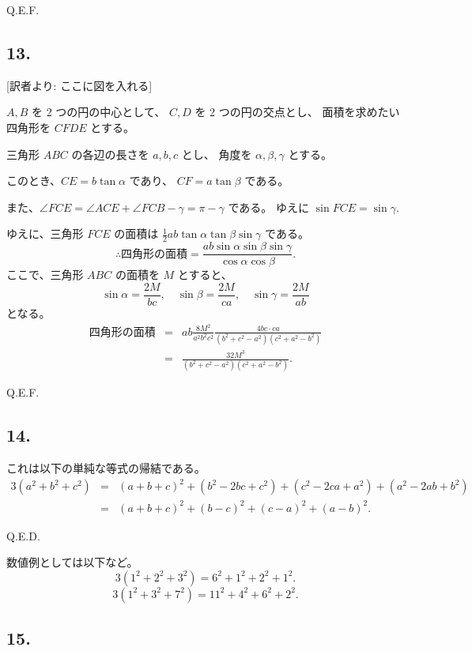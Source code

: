 Q.E.F.


\subsection*{13.}

[訳者より: ここに図を入れる]

$A, B$ を 2 つの円の中心として、
$C, D$ を 2 つの円の交点とし、
面積を求めたい四角形を $CFDE$ とする。

三角形 $ABC$ の各辺の長さを $a, b, c$ とし、
角度を $\alpha, \beta, \gamma$ とする。

このとき、$CE = b \tan \alpha$ であり、
$CF = a \tan \beta$ である。

また、$\angle FCE = \angle ACE + \angle FCB - \gamma = \pi - \gamma$
である。
ゆえに $\sin FCE = \sin \gamma$.

ゆえに、三角形 $FCE$ の面積は
$\frac{1}{2} ab \tan \alpha \tan \beta \sin \gamma$
である。
\[
\therefore
\mbox{四角形の面積} =
\frac{ab \sin \alpha \sin \beta \sin \gamma}{\cos \alpha \cos \beta}.
\]
ここで、三角形 $ABC$ の面積を $M$ とすると、
\[
\sin \alpha = \frac{2M}{bc},
\quad \sin \beta = \frac{2M}{ca},
\quad \sin \gamma = \frac{2M}{ab}
\]
となる。
\begin{eqnarray*}
\mbox{四角形の面積}
&=& ab \frac{8M^2}{a^2 b^2 c^2} \frac{4bc \cdot ca}{(b^2 + c^2 - a^2)(c^2 + a^2 - b^2)}\\
&=& \frac{32 M^3}{(b^2 + c^2 - a^2)(c^2 + a^2 - b^2)}.
\end{eqnarray*}

Q.E.F.

\subsection*{14.}

これは以下の単純な等式の帰結である。
\begin{eqnarray*}
3(a^2 + b^2 + c^2)
&=&
(a + b + c)^2 + (b^2 - 2bc + c^2) + (c^2 - 2ca + a^2) + (a^2 - 2ab + b^2)\\
&=&
(a + b + c)^2 + (b - c)^2 + (c - a)^2 + (a - b)^2.
\end{eqnarray*}

Q.E.D.

数値例としては以下など。
\[
3(1^2 + 2^2 + 3^2) = 6^2 + 1^2 + 2^2 + 1^2.
\]
\[
3(1^2 + 3^2 + 7^2) = 11^2 + 4^2 + 6^2 + 2^2.
\]

\subsection*{15.}

